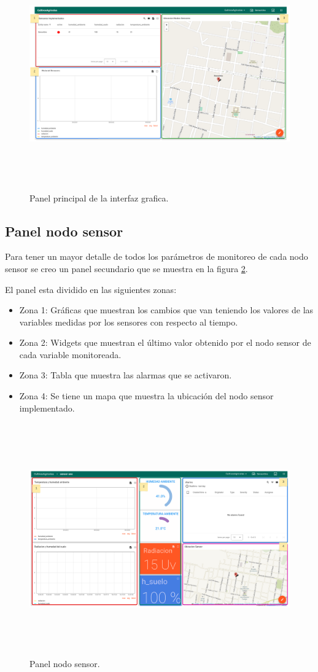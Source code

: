 \begin{figure}[h]
  \centering
	\includegraphics[width=\textwidth, height=10cm]{./Figures/panel_principal_editado.png}
  \caption{Panel principal de la interfaz grafica.}
	\label{fig:Panel principal}
\end{figure}

\clearpage
\subsection{Panel nodo sensor} 

Para tener un mayor detalle de todos los parámetros de monitoreo de cada nodo sensor se creo un panel secundario que se muestra en la figura \ref{fig:Panel nodo sensor}.

El panel esta dividido en las siguientes zonas:
\begin{itemize}
  \item Zona 1: Gráficas que muestran los cambios que van teniendo los valores de las variables medidas por los sensores con respecto al tiempo.
  \item Zona 2: Widgets que muestran el último valor obtenido por el nodo sensor de cada variable monitoreada.
  \item Zona 3: Tabla que muestra las alarmas que se activaron. 
  \item Zona 4: Se tiene un mapa que muestra la ubicación del nodo sensor implementado.
\end{itemize}

\begin{figure}[h!]
  \centering
	\includegraphics[width=\textwidth, height=10cm]{./Figures/panel_nodosensor_editado.png}
  \caption{Panel nodo sensor.}
	\label{fig:Panel nodo sensor}
\end{figure}